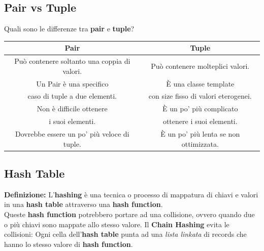 \subsection{Pair vs Tuple}

\textsf{\small Quali sono le differenze tra \textbf{pair} e \textbf{tuple}?} \\

\begin{tabular}{|c|c|}
	\hline
	\textbf{Pair} & \textbf{Tuple} \\
	\hline
	\textsf{\small Può contenere soltanto una coppia di valori.} & \textsf{\small Può contenere molteplici valori.} \\
	\hline
	\textsf{\small Un Pair è una specifico } & \textsf{\small È una classe template } \\
	\textsf{\small caso di tuple a due elementi.} & \textsf{\small con size fisso di valori eterogenei.} \\
	\hline
	\textsf{\small Non è difficile ottenere } & \textsf{\small È un po' più complicato } \\
	\textsf{\small i suoi elementi.} & \textsf{\small ottenere i suoi elementi.} \\
	\hline
	\textsf{\small Dovrebbe essere un po' più veloce di tuple.} & \textsf{\small È un po' più lenta se non ottimizzata.} \\
	\hline
\end{tabular}

\subsection{Hash Table}

\textsf{\small \textbf{Definizione: } L'\textbf{hashing} è una tecnica o processo di mappatura di chiavi e valori in una \textbf{hash table} attraverso una \textbf{hash function}.} \\

\textsf{\small Queste \textbf{hash function} potrebbero portare ad una collisione, ovvero quando due o più chiavi sono mappate allo stesso valore. Il \textbf{Chain Hashing} evita le collisioni: Ogni cella dell'\textbf{hash table} punta ad una \emph{lista linkata} di records che hanno lo stesso valore di \textbf{hash function}.} \\

